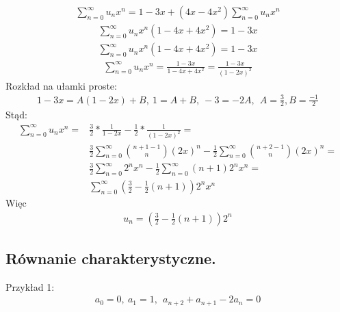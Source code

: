 \documentclass[12pt]{article}
\begin{document}
    \begin{align*}
        \sum_{n=0}^{\infty} u_n x^n = 1 - 3x + (4x - 4x^2) \sum_{n=0}^{\infty} u_n x^n
    \end{align*}
    \begin{align*}
        \sum_{n=0}^{\infty} u_n x^n (1 - 4x + 4x^2) = 1 - 3x
    \end{align*}
    \begin{align*}
        \sum_{n=0}^{\infty} u_n x^n (1 - 4x + 4x^2) = 1 - 3x
    \end{align*}
    \begin{align*}
        \sum_{n=0}^{\infty} u_n x^n = \frac{1 - 3x}{1 - 4x + 4x^2} = \frac{1 - 3x}{(1 - 2x)^2}
    \end{align*}
    Rozkład na ułamki proste:
    \begin{align*}
        1 - 3x = A(1 - 2x) + B, ~ 1 = A + B, ~ -3 = -2A, ~~ A = \frac{3}{2}, B = \frac{-1}{2}
    \end{align*}
    Stąd:
    \begin{align*}
        \sum_{n=0}^{\infty} u_n x^n = &\frac{3}{2} * \frac{1}{1 - 2x} - \frac{1}{2} * \frac{1}{(1 - 2x)^2} =\\
        &\frac{3}{2} \sum_{n=0}^{\infty} \binom{n+1-1}{n} (2x)^n - \frac{1}{2} \sum_{n=0}^{\infty} \binom{n+2-1}{n} (2x)^n =\\
        &\frac{3}{2} \sum_{n=0}^{\infty} 2^n x^n - \frac{1}{2} \sum_{n=0}^{\infty} (n+1) 2^n x^n =\\
        &\sum_{n=0}^{\infty} (\frac{3}{2} - \frac{1}{2}(n+1)) 2^n x^n
    \end{align*}
    Więc
    \begin{align*}
        u_n = (\frac{3}{2} - \frac{1}{2}(n+1)) 2^n
    \end{align*}


    \subsection{Równanie charakterystyczne.}
    Przykład 1:
    \begin{align*}
        a_0 = 0, ~ a_1 = 1, ~~ a_{n+2} + a_{n+1} - 2 a_n = 0
    \end{align*}
\end{document}
